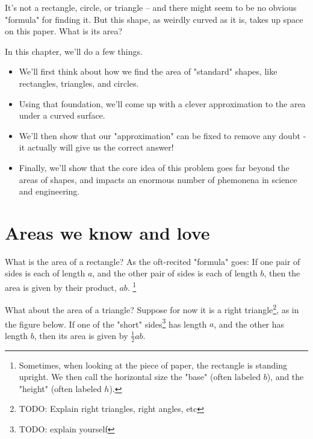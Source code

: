 \documentclass{book}
\begin{document}
It's not a rectangle, circle, or triangle -- and there might seem to be no obvious "formula" for finding it. But this shape, as weirdly curved as it is, takes up space on this paper. What is its area? 


In this chapter, we'll do a few things. 

\begin{itemize}
\item We'll first think about how we find the area of "standard" shapes, like rectangles, triangles, and circles.
\item Using that foundation, we'll come up with a clever approximation to the area under a curved surface. 
\item We'll then show that our "approximation" can be fixed to remove any doubt - it actually will give us the correct answer!
\item Finally, we'll show that the core idea of this problem goes far beyond the areas of shapes, and impacts an enormous number of phemonena in science and engineering.
\end{itemize}


\section{Areas we know and love}

What is the area of a rectangle? As the oft-recited "formula" goes: If one pair of sides is each of length $a$, and the other pair of sides is each of length $b$, then the area is given by their product, $ab$. \footnote{Sometimes, when looking at the piece of paper, the rectangle is standing upright. We then call the horizontal size the "base" (often labeled $b$), and the "height" (often labeled $h$).}



What about the area of a triangle? Suppose for now it is a right triangle\footnote{TODO: Explain right triangles, right angles, etc}, as in the figure below. If one of the "short" sides\footnote{TODO: explain yourself} has length $a$, and the other has length $b$, then its area is given by $\frac{1}{2}ab$. 

\end{document}
